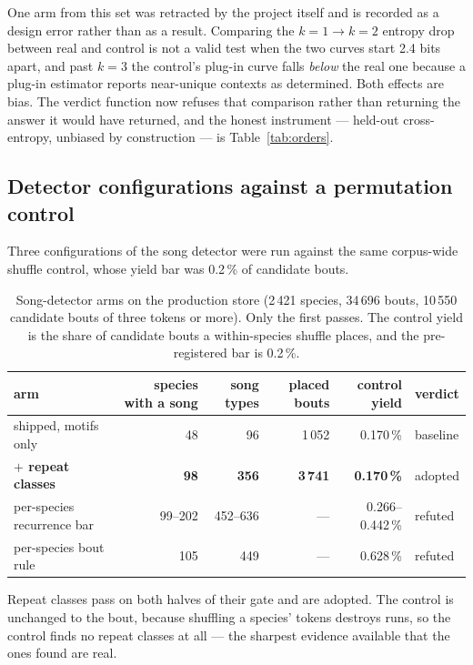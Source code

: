 \documentclass[10pt,twocolumn,a4paper]{article}
\begin{document}
One arm from this set was retracted by the project itself and is recorded as a design error
rather than as a result. Comparing the $k=1 \to k=2$ entropy drop between real and control
is not a valid test when the two curves start 2.4 bits apart, and past $k=3$ the control's
plug-in curve falls \emph{below} the real one because a plug-in estimator reports
near-unique contexts as determined. Both effects are bias. The verdict function now refuses
that comparison rather than returning the answer it would have returned, and the honest
instrument --- held-out cross-entropy, unbiased by construction --- is
Table~\ref{tab:orders}.

\subsection{Detector configurations against a permutation control}

Three configurations of the song detector were run against the same corpus-wide shuffle
control, whose yield bar was 0.2\,\% of candidate bouts.

\begin{table}[t]
\centering
\small
\caption{Song-detector arms on the production store (2\,421 species, 34\,696 bouts, 10\,550
candidate bouts of three tokens or more). Only the first passes. The control yield is the
share of candidate bouts a within-species shuffle places, and the pre-registered bar is
0.2\,\%.}
\label{tab:songdetector}
\begin{tabular}{L{5.6cm} r r r r l}
\toprule
arm & species with a song & song types & placed bouts & control yield & verdict \\
\midrule
shipped, motifs only & 48 & 96 & 1\,052 & 0.170\,\% & baseline \\
\textbf{$+$ repeat classes} & \textbf{98} & \textbf{356} & \textbf{3\,741} & \textbf{0.170\,\%} & adopted \\
per-species recurrence bar & 99--202 & 452--636 & --- & 0.266--0.442\,\% & refuted \\
per-species bout rule & 105 & 449 & --- & 0.628\,\% & refuted \\
\bottomrule
\end{tabular}
\end{table}

Repeat classes pass on both halves of their gate and are adopted. The control is unchanged
to the bout, because shuffling a species' tokens destroys runs, so the control finds no
repeat classes at all --- the sharpest evidence available that the ones found are real.
\end{document}
